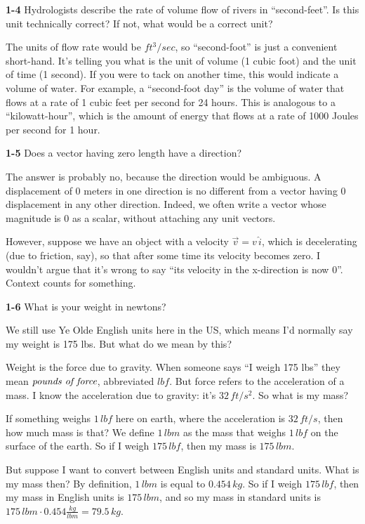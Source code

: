 \documentclass{amsart}
\begin{document}
\textbf{1-4} Hydrologists describe the rate of volume flow of rivers in ``second-feet''.
Is this unit technically correct?
If not, what would be a correct unit?

The units of flow rate would be $ft^{3}/sec$, so ``second-foot'' is just a convenient short-hand.
It's telling you what is the unit of volume (1 cubic foot) and the unit of time (1 second).
If you were to tack on another time, this would indicate a volume of water.
For example, a ``second-foot day'' is the volume of water that flows at a rate of 1 cubic feet per second for 24 hours.
This is analogous to a ``kilowatt-hour'', which is the amount of energy that flows at a rate of 1000 Joules per second for 1 hour.

\textbf{1-5} Does a vector having zero length have a direction?

The answer is probably no, because the direction would be ambiguous.
A displacement of 0 meters in one direction is no different from a vector having 0 displacement in any other direction.
Indeed, we often write a vector whose magnitude is 0 as a scalar, without attaching any unit vectors.

However, suppose we have an object with a velocity $\vec v = v \, \hat i$, which is decelerating (due to friction, say),
so that after some time its velocity becomes zero.
I wouldn't argue that it's wrong to say ``its velocity in the x-direction is now 0''.
Context counts for something.

\textbf{1-6} What is your weight in newtons?

We still use Ye Olde English units here in the US, which means I'd normally say my weight is 175 lbs.
But what do we mean by this?

Weight is the force due to gravity.
When someone says ``I weigh 175 lbs'' they mean $\emph{pounds of force}$, abbreviated $lbf$.
But force refers to the acceleration of a mass.  I know the acceleration due to gravity: it's $32 \, ft/s^{2}$.
So what is my mass?

If something weighs $1 \, lbf$ here on earth, where the acceleration is $32 \, ft/s$, then how much mass is that?
We define $1 \, lbm$ as the mass that weighs $1 \, lbf$ on the surface of the earth.
So if I weigh $175 \, lbf$, then my mass is $175 \, lbm$.

But suppose I want to convert between English units and standard units.
What is my mass then?
By definition, $1 \, lbm$ is equal to $0.454 \, kg$.
So if I weigh $175 \, lbf$, then my mass in English units is $175 \, lbm$,
and so my mass in standard units is $175 \, lbm \cdot 0.454 \frac{kg}{lbm} = 79.5 \, kg$.
\end{document}
